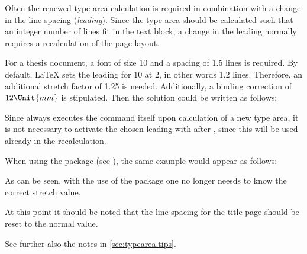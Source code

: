Often the renewed type area calculation is required in combination
with a change in the line spacing
(\emph{leading}). Since the type area should be
calculated such that an integer number of lines fit in the text block,
a change in the leading normally requires a recalculation of the page
layout.
 
\begin{Example}
  For a thesis document, a font of size 10 and a spacing of
  1.5 lines is required. By default, {\LaTeX} sets the leading for
  10 at 2, in other words 1.2 lines. Therefore, an
  additional stretch factor of 1.25 is needed. Additionally, a binding
  correction of \(12\Unit{mm}\) is stipulated. Then the solution could be
  written as follows:
Since  always executes the command
 itself upon calculation of a new type area, it is
not necessary to activate the chosen leading with 
after , since this will be used already in the
recalculation.

When using the  package (see
\cite{package:setspace}), the same example would appear as follows:
As can be seen, with the use of the  package one no
longer neesds to know the correct stretch value.

At this point it should be noted that the line spacing for the title
page should be reset to the normal value.
\iffalse%
  A complete example would be:
\fi
{}
  See further also the notes in \autoref{sec:typearea.tips}.
\end{Example}

